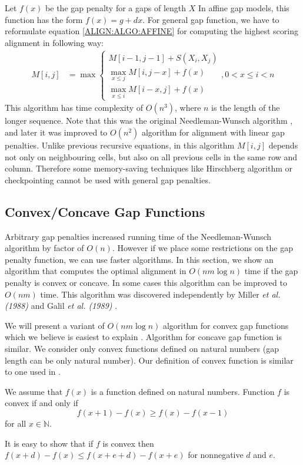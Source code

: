Let $f(x)$ be the gap penalty for a gaps of length $X$
In 
affine gap models, this function has the form $f(x)=g+dx$. For general gap function, we have to
reformulate equation \ref{ALIGN:ALGO:AFFINE} for computing the highest scoring
alignment in following way:
\begin{align}
M[i,j] &= \max
\begin{cases}
 M[i-1,j-1]+S(X_i,X_j)\\
 \max_{x\leq j}M[i,j-x]+f(x)\\
 \max_{x\leq i}M[i-x,j]+f(x)
\end{cases}, 0<x\leq i<n\label{ALIGN:ARBITRARYGAPEQUATION}
\end{align}
This algorithm has time complexity of $O(n^3)$, where $n$ is the length of the
longer sequence. Note that this was the original Needleman-Wunsch 
algorithm \cite{Needleman1970}, and later it was improved to $O(n^2)$ algorithm
\cite{Sankoff1972} for alignment with linear gap penalties.
Unlike previous recursive equations, in this algorithm $M[i,j]$ depends not
only on neighbouring cells, but also on all previous cells in the same row and column.
Therefore some memory-saving techniques like Hirschberg algorithm or checkpointing cannot be
used with general gap penalties.


\subsection{Convex/Concave Gap Functions}\label{SECTION:CONVEX}

Arbitrary gap penalties increased running time of the Needleman-Wunsch algorithm
by factor of $O(n)$. However if we place some
restrictions on the  gap penalty function, we can use faster algorithms. In this
section, we
show an algorithm that computes the optimal alignment in $O(nm\log n)$ time if
the gap
penalty is convex or concave. In some cases this algorithm can be improved to
$O(nm)$ time. This algorithm was discovered independently by Miller
{\it et al. (1988)} and Galil {\it et al. (1989)} \nocite{Miller1988,Galil1989}.

We will present a variant of $O(nm\log n)$ algorithm for convex gap functions which
we believe is easiest to explain . Algorithm for concave gap function is similar.
We consider only convex functions defined on natural numbers (gap length can be only
natural number). Our definition of convex function is similar to one used in
\cite{GusfieldBook}.


\begin{definition}
We assume that $f(x)$ is a  function defined on natural numbers. Function $f$
is convex if and only if 
\[f(x+1)-f(x)\geq f(x)-f(x-1)\]
for all $x\in\mathbb{N}$.
\end{definition}
\begin{note}
It is easy to show that if $f$ is convex then $f(x+d)-f(x) \leq f(x+e+d) -
f(x+e)$ for nonnegative $d$ and $e$.
\end{note}

